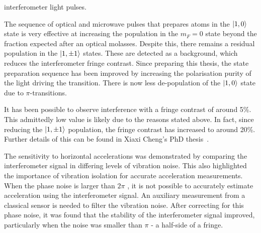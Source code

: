 interferometer light pulses.
\par\noindent
The sequence of optical and microwave pulses that prepares
atoms in the $\ket{1,0}$ state is very effective at increasing
the population in the $m_F = 0$ state beyond the fraction expected
after an optical molasses. Despite this, there remains a residual
population in the $\ket{1,\pm 1}$ states. These are detected as a
background, which reduces the interferometer fringe contrast. Since
preparing this thesis, the state preparation sequence has been
improved by increasing the polarisation purity of the light driving
the  transition. There is now less de-population of the
$\ket{1,0}$ state due to $\pi$-transitions. 
\par\noindent
It has been possible to observe interference with a fringe contrast of
around 5\%. This admittedly low value is likely due to the reasons
stated above. In fact, since reducing the $\ket{1,\pm 1}$ population,
the fringe contrast has increased to around 20\%. Further details of
this can be found in Xiaxi Cheng's PhD thesis~\cite{Cheng2018}.
\par\noindent
The sensitivity to horizontal accelerations was demonstrated by
comparing the interferometer signal in differing levels of vibration
noise. This also highlighted the importance of vibration isolation for
accurate acceleration measurements. When the phase noise is larger
than $2\pi$ \sivalue{}{\radian}, it
is not possible to accurately estimate acceleration using the
interferometer signal. An auxiliary measurement from a classical
sensor is needed to filter the vibration noise. After correcting for
this phase noise, it was found that the stability of the
interferometer signal improved, particularly when the noise was
smaller than $\pi$ \sivalue{}{\radian} - a half-side of a fringe. 
